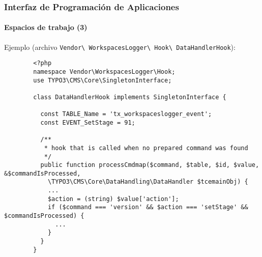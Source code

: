 
\begin{frame}[fragile]
	\frametitle{Interfaz de Programación de Aplicaciones}
	\framesubtitle{Espacios de trabajo (3)}

	Ejemplo (archivo \texttt{Vendor\textbackslash
		WorkspacesLogger\textbackslash
		Hook\textbackslash
		DataHandlerHook}):

	\lstset{
		basicstyle=\tiny\ttfamily
	}

	\begin{lstlisting}
		<?php
		namespace Vendor\WorkspacesLogger\Hook;
		use TYPO3\CMS\Core\SingletonInterface;

		class DataHandlerHook implements SingletonInterface {

		  const TABLE_Name = 'tx_workspaceslogger_event';
		  const EVENT_SetStage = 91;

		  /**
		   * hook that is called when no prepared command was found
		   */
		  public function processCmdmap($command, $table, $id, $value, &$commandIsProcessed,
		    \TYPO3\CMS\Core\DataHandling\DataHandler $tcemainObj) {
		    ...
		    $action = (string) $value['action'];
		    if ($command === 'version' && $action === 'setStage' && $commandIsProcessed) {
		      ...
		    }
		  }
		}
	\end{lstlisting}

\end{frame}


